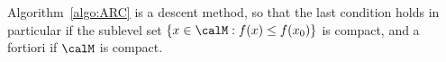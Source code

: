 \begin{theorem}
	Algorithm~\ref{algo:ARC} is a descent method, so that the last condition holds in particular if the sublevel set $\{x \in \calM : f(x) \leq f(x_0)\}$ is compact, and a fortiori if $\calM$ is compact.
%
\end{theorem}
